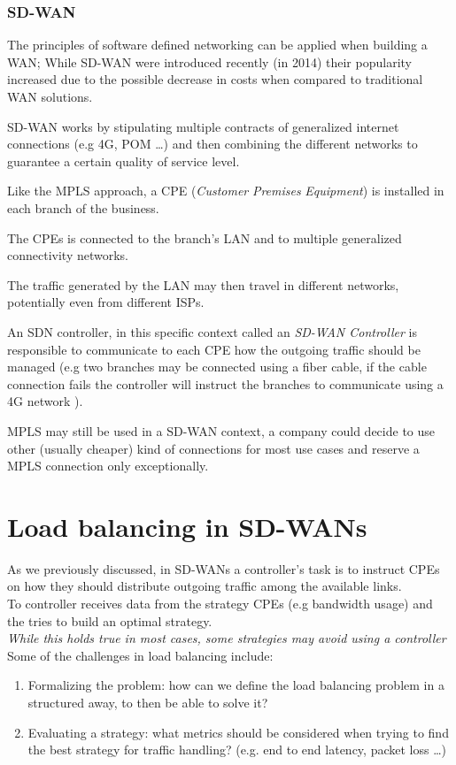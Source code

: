 \documentclass{article}
\begin{document}
   \subsubsection{SD-WAN}
   The principles of software defined networking can be applied when building a WAN;
   While SD-WAN were introduced recently (in 2014) their popularity increased due to the possible decrease in costs when compared to traditional WAN solutions.
   
   SD-WAN works by stipulating multiple contracts of generalized internet connections (e.g 4G, POM \dots) and then combining the different networks to guarantee a certain quality of service level.
  
   Like the MPLS approach, a CPE (\textit{Customer} \textit{Premises} \textit{Equipment}) is installed in each branch of the business.
   
   The CPEs is connected to the branch's LAN and to multiple generalized connectivity networks.
  
   The traffic generated by the LAN may then travel in different networks, potentially even from different ISPs.
   
   An SDN controller, in this specific context called an \textit{SD-WAN Controller} is responsible to communicate to each CPE how the outgoing traffic should be managed (e.g two branches may be connected using a fiber cable, if the cable connection fails the controller will instruct the branches to communicate using a 4G network ).
   
   MPLS may still be used in a SD-WAN context, a company could decide to use other (usually cheaper) kind of connections for most use cases and reserve a MPLS connection only exceptionally.
   
 
 \section{Load balancing in SD-WANs}
 
 As we previously discussed, in SD-WANs a controller's task is to instruct CPEs on how they should distribute outgoing traffic among the available links. \\
 To controller receives data from the strategy CPEs (e.g bandwidth usage) and the tries to build an optimal strategy. \\
 \textit{While this holds true in most cases, some strategies may avoid using a controller} \\
 Some of the challenges in load balancing include:
 \begin{enumerate}
 	\item Formalizing the problem: how can we define the load balancing problem in a structured away, to then be able to solve it?
 	\item Evaluating a strategy: what metrics should be considered when trying to find the best strategy for traffic handling? (e.g. end to end latency, packet loss \dots)
 \end{enumerate}
\pagebreak
\end{document}
